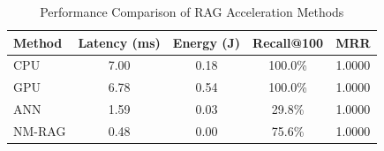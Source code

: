 \begin{table}[H]
    \centering
    \caption{Performance Comparison of RAG Acceleration Methods}
    \label{tab:results}
    \begin{tabular}{|l|c|c|c|c|}
        \hline
        \textbf{Method} & \textbf{Latency (ms)} & \textbf{Energy (J)} & \textbf{Recall@100} & \textbf{MRR} \\
        \hline
        CPU & 7.00 & 0.18 & 100.0\% & 1.0000 \\
        \hline
        GPU & 6.78 & 0.54 & 100.0\% & 1.0000 \\
        \hline
        ANN & 1.59 & 0.03 & 29.8\% & 1.0000 \\
        \hline
        NM-RAG & 0.48 & 0.00 & 75.6\% & 1.0000 \\
        \hline
    \end{tabular}
\end{table}
